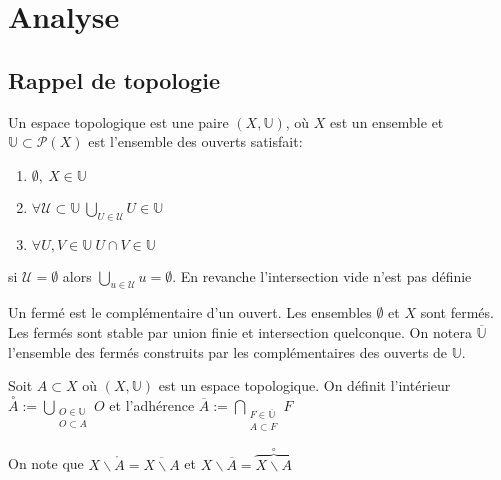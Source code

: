 \section{Analyse}
\subsection{ Rappel de topologie }

\begin{definition}

Un espace topologique est une paire $(X, \mathbb{U})$, où $X$ est un ensemble et \\$\mathbb{U}\subset \mathcal{P}(X)$ est l'ensemble des ouverts satisfait:\\
        \begin{enumerate}
            \item $\emptyset, \ X\in \mathbb{U}$
            \item $\forall \mathcal{U}\subset \mathbb{U}\ \bigcup_{U\in \mathcal{U}} U\in \mathbb{U}$
            \item $\forall U,V\in \mathbb{U}\ U \cap V \in \mathbb{U}$
            \end{enumerate}
\end{definition}            
            
\begin{remarque}
si $\mathcal{U}=\emptyset $ alors $\bigcup\limits_{u\in \mathcal{U}} u = \emptyset $. En revanche l'intersection vide n'est pas définie
\end{remarque}
\begin{remarque}
Un fermé est le complémentaire d'un ouvert. Les ensembles $\emptyset$ et $X$ sont fermés. Les fermés sont stable par union finie et intersection quelconque. On notera $\overline{\mathbb{U}}$ l'ensemble des fermés construits par les complémentaires des ouverts de $\mathbb{U}$.
\end{remarque}

\begin{definition}
Soit $A\subset X$ où $(X,\mathbb{U})$ est un espace topologique. On définit l'intérieur $\overset{\circ}{A}:=\bigcup_{\substack{O\in \mathbb{U}\\O\subset A}}O$ et l'adhérence $\overline{A}:=\bigcap\limits_{\substack{F \in \overline{\mathbb{U}} \\ A\subset F}}F$
\end{definition}
On note que $X\backslash\mathring{A}=\overline{X\backslash A}$ et $X\backslash\overline{A} =\overbrace{X\backslash A}^{\circ}$

